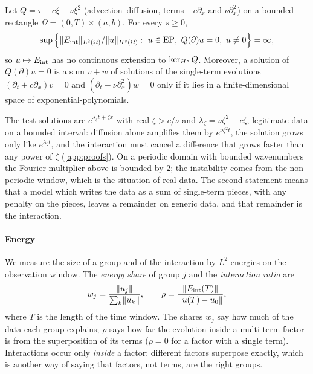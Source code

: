 \begin{proposition}\label{prop:discont}
Let $Q=\tau+c\xi-\nu\xi^2$ (advection--diffusion, terms $-c\partial_x$ and $\nu\partial_x^2$) on a bounded
rectangle $\Omega=(0,T)\times(a,b)$. For every $s\ge0$,
\[
  \sup\Big\{\norm{\Eint}_{L^2(\Omega)}/\norm{u}_{\Hs(\Omega)}:\ u\in\EP,\ Q(\partial)u=0,\ u\ne0\Big\}=\infty,
\]
so $u\mapsto E_{\mathrm{int}}$ has no continuous extension to $\ker_{H^{s}}Q$. Moreover, a solution of $Q(\partial)u=0$ is a
sum $v+w$ of solutions of the single-term evolutions $(\partial_t+c\partial_x)v=0$ and $(\partial_t-\nu\partial_x^2)w=0$ only
if it lies in a finite-dimensional space of exponential-polynomials.
\end{proposition}

The test solutions are $e^{\lambda_\zeta t+\zeta x}$ with real $\zeta>c/\nu$ and $\lambda_\zeta=\nu\zeta^2-c\zeta$, legitimate
data on a bounded interval: diffusion alone amplifies them by $e^{\nu\zeta^2t}$, the solution grows only like
$e^{\lambda_\zeta t}$, and the interaction must cancel a difference that grows faster than any power of $\zeta$
(\cref{app:proofs}). On a periodic domain with bounded wavenumbers the Fourier multiplier above is bounded by
$2$; the instability comes from the non-periodic window, which is the situation of real data. The second
statement means that a model which writes the data as a sum of single-term pieces, with any penalty on the
pieces, leaves a remainder on generic data, and that remainder is the interaction.

\paragraph{Energy}
We measure the size of a group and of the interaction by $L^2$ energies on the observation window.
The \emph{energy share} of group $j$ and the \emph{interaction ratio} are
\begin{equation}\label{eq:energy}
  w_j=\frac{\lVert u_j\rVert}{\sum_k\lVert u_k\rVert},\qquad
  \rho=\frac{\lVert E_{\mathrm{int}}(T)\rVert}{\lVert u(T)-u_0\rVert} ,
\end{equation}
where $T$ is the length of the time window. The shares $w_j$ say how much of the data each group
explains; $\rho$ says how far the evolution inside a multi-term factor is from the superposition of its
terms ($\rho=0$ for a factor with a single term). Interactions occur only \emph{inside} a factor:
different factors superpose exactly, which is another way of saying that factors, not terms, are the
right groups.

